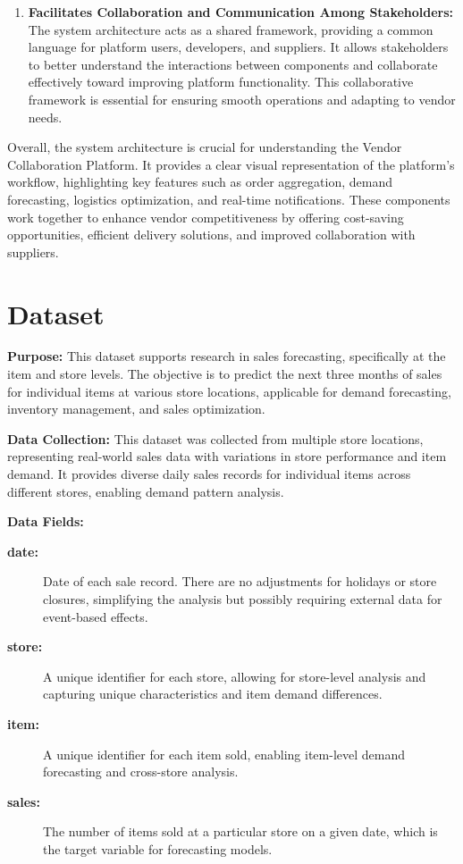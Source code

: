 \begin{enumerate}
    \item \textbf{Facilitates Collaboration and Communication Among Stakeholders:} The system architecture acts as a shared framework, providing a common language for platform users, developers, and suppliers. It allows stakeholders to better understand the interactions between components and collaborate effectively toward improving platform functionality. This collaborative framework is essential for ensuring smooth operations and adapting to vendor needs.

\end{enumerate}

\noindent Overall, the system architecture is crucial for understanding the Vendor Collaboration Platform. It provides a clear visual representation of the platform’s workflow, highlighting key features such as order aggregation, demand forecasting, logistics optimization, and real-time notifications. These components work together to enhance vendor competitiveness by offering cost-saving opportunities, efficient delivery solutions, and improved collaboration with suppliers.

\section{Dataset}


\textbf{Purpose:} This dataset supports research in sales forecasting, specifically at the item and store levels. The objective is to predict the next three months of sales for individual items at various store locations, applicable for demand forecasting, inventory management, and sales optimization.

\textbf{Data Collection:} This dataset was collected from multiple store locations, representing real-world sales data with variations in store performance and item demand. It provides diverse daily sales records for individual items across different stores, enabling demand pattern analysis.

\textbf{Data Fields:}
\begin{description}
    \item[\textbf{date:}] Date of each sale record. There are no adjustments for holidays or store closures, simplifying the analysis but possibly requiring external data for event-based effects.
    \item[\textbf{store:}] A unique identifier for each store, allowing for store-level analysis and capturing unique characteristics and item demand differences.
    \item[\textbf{item:}] A unique identifier for each item sold, enabling item-level demand forecasting and cross-store analysis.
    \item[\textbf{sales:}] The number of items sold at a particular store on a given date, which is the target variable for forecasting models.
\end{description}

